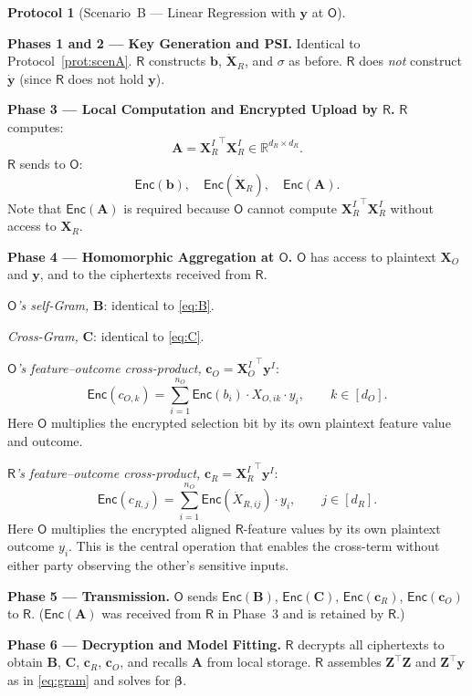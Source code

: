 \documentclass[12pt]{article}
\theoremstyle{definition}
\newtheorem{protocol}{Protocol}[section]
\theoremstyle{plain}
\newcommand{\R}{\mathbb{R}}
\newcommand{\Enc}[1]{\mathsf{Enc}\!\left(#1\right)}
\newcommand{\bXR}{\mathbf{X}_{R}}
\newcommand{\bXO}{\mathbf{X}_{O}}
\newcommand{\bXRI}{\mathbf{X}_{R}^{I}}
\newcommand{\bXOI}{\mathbf{X}_{O}^{I}}
\newcommand{\bZ}{\mathbf{Z}}
\newcommand{\by}{\mathbf{y}}
\newcommand{\bb}{\mathbf{b}}
\newcommand{\bbeta}{\boldsymbol{\beta}}
\newcommand{\bA}{\mathbf{A}}
\newcommand{\bB}{\mathbf{B}}
\newcommand{\bC}{\mathbf{C}}
\newcommand{\bcR}{\mathbf{c}_{R}}
\newcommand{\bcO}{\mathbf{c}_{O}}
\newcommand{\dXR}{\dot{\mathbf{X}}_{R}}
\newcommand{\dy}{\dot{\mathbf{y}}}
\newcommand{\Party}[1]{\textsf{#1}}
\begin{document}
\begin{protocol}[Scenario~B --- Linear Regression with $\by$ at $\Party{O}$]
\label{prot:scenB}
\hfill

\smallskip
\textbf{Phases 1 and 2 --- Key Generation and PSI.} Identical to Protocol~\ref{prot:scenA}. $\Party{R}$ constructs $\bb$, $\dXR$, and $\sigma$ as before. $\Party{R}$ does \emph{not} construct $\dy$ (since $\Party{R}$ does not hold $\by$).

\smallskip
\textbf{Phase 3 --- Local Computation and Encrypted Upload by $\Party{R}$.}
$\Party{R}$ computes:
\[
  \bA = {\bXRI}^{\top}\bXRI \in \R^{d_{R} \times d_{R}}.
\]
$\Party{R}$ sends to $\Party{O}$:
\[
  \Enc{\bb}, \quad \Enc{\dXR}, \quad \Enc{\bA}.
\]
Note that $\Enc{\bA}$ is required because $\Party{O}$ cannot compute ${\bXRI}^{\top}\bXRI$ without access to $\bXR$.

\smallskip
\textbf{Phase 4 --- Homomorphic Aggregation at $\Party{O}$.}
$\Party{O}$ has access to plaintext $\bXO$ and $\by$, and to the ciphertexts received from $\Party{R}$.

\emph{$\Party{O}$'s self-Gram,} $\bB$: identical to \eqref{eq:B}.

\emph{Cross-Gram,} $\bC$: identical to \eqref{eq:C}.

\emph{$\Party{O}$'s feature--outcome cross-product,} $\bcO = {\bXOI}^{\top}\by^{I}$:
\begin{equation}
  \label{eq:cO_B}
  \Enc{c_{O,k}} = \sum_{i=1}^{n_{O}} \Enc{b_{i}} \cdot X_{O,ik} \cdot y_{i},
  \qquad k \in [d_{O}].
\end{equation}
Here $\Party{O}$ multiplies the encrypted selection bit by its own plaintext feature value and outcome.

\emph{$\Party{R}$'s feature--outcome cross-product,} $\bcR = {\bXRI}^{\top}\by^{I}$:
\begin{equation}
  \label{eq:cR_B}
  \Enc{c_{R,j}} = \sum_{i=1}^{n_{O}} \Enc{\dot{X}_{R,ij}} \cdot y_{i},
  \qquad j \in [d_{R}].
\end{equation}
Here $\Party{O}$ multiplies the encrypted aligned $\Party{R}$-feature values by its own plaintext outcome $y_{i}$. This is the central operation that enables the cross-term without either party observing the other's sensitive inputs.

\smallskip
\textbf{Phase 5 --- Transmission.}
$\Party{O}$ sends $\Enc{\bB}$, $\Enc{\bC}$, $\Enc{\bcR}$, $\Enc{\bcO}$ to $\Party{R}$. ($\Enc{\bA}$ was received from $\Party{R}$ in Phase~3 and is retained by $\Party{R}$.)

\smallskip
\textbf{Phase 6 --- Decryption and Model Fitting.}
$\Party{R}$ decrypts all ciphertexts to obtain $\bB$, $\bC$, $\bcR$, $\bcO$, and recalls $\bA$ from local storage. $\Party{R}$ assembles $\bZ^{\top}\bZ$ and $\bZ^{\top}\by$ as in \eqref{eq:gram} and solves for $\bbeta$.
\end{protocol}
\end{document}
